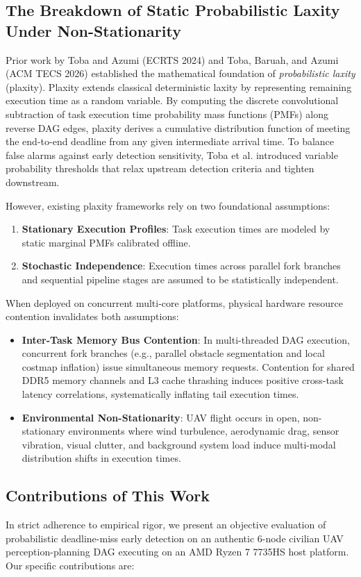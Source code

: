 \documentclass[conference]{IEEEtran}
\begin{document}
\subsection{The Breakdown of Static Probabilistic Laxity Under Non-Stationarity}
Prior work by Toba and Azumi (ECRTS 2024) and Toba, Baruah, and Azumi (ACM TECS 2026) established the mathematical foundation of \textit{probabilistic laxity} (plaxity). Plaxity extends classical deterministic laxity by representing remaining execution time as a random variable. By computing the discrete convolutional subtraction of task execution time probability mass functions (PMFs) along reverse DAG edges, plaxity derives a cumulative distribution function of meeting the end-to-end deadline from any given intermediate arrival time. To balance false alarms against early detection sensitivity, Toba et al. introduced variable probability thresholds that relax upstream detection criteria and tighten downstream.

However, existing plaxity frameworks rely on two foundational assumptions:
\begin{enumerate}
    \item \textbf{Stationary Execution Profiles}: Task execution times are modeled by static marginal PMFs calibrated offline.
    \item \textbf{Stochastic Independence}: Execution times across parallel fork branches and sequential pipeline stages are assumed to be statistically independent.
\end{enumerate}

When deployed on concurrent multi-core platforms, physical hardware resource contention invalidates both assumptions:
\begin{itemize}
    \item \textbf{Inter-Task Memory Bus Contention}: In multi-threaded DAG execution, concurrent fork branches (e.g., parallel obstacle segmentation and local costmap inflation) issue simultaneous memory requests. Contention for shared DDR5 memory channels and L3 cache thrashing induces positive cross-task latency correlations, systematically inflating tail execution times.
    \item \textbf{Environmental Non-Stationarity}: UAV flight occurs in open, non-stationary environments where wind turbulence, aerodynamic drag, sensor vibration, visual clutter, and background system load induce multi-modal distribution shifts in execution times.
\end{itemize}

\subsection{Contributions of This Work}
In strict adherence to empirical rigor, we present an objective evaluation of probabilistic deadline-miss early detection on an authentic 6-node civilian UAV perception-planning DAG executing on an AMD Ryzen 7 7735HS host platform. Our specific contributions are:
\end{document}
